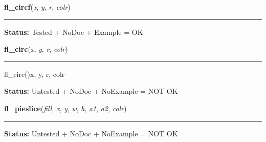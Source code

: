     \label{xformslib:library:fl_circf}

    \vspace{0.5ex}

\hspace{.8\funcindent}\begin{boxedminipage}{\funcwidth}

    \raggedright \textbf{fl\_circf}(\textit{x}, \textit{y}, \textit{r}, \textit{colr})

    \vspace{-1.5ex}

    \rule{\textwidth}{0.5\fboxrule}
\setlength{\parskip}{2ex}
\setlength{\parskip}{1ex}
\textbf{Status:} Tested + NoDoc + Example = OK



    \end{boxedminipage}

    \label{xformslib:library:fl_circ}

    \vspace{0.5ex}

\hspace{.8\funcindent}\begin{boxedminipage}{\funcwidth}

    \raggedright \textbf{fl\_circ}(\textit{x}, \textit{y}, \textit{r}, \textit{colr})

    \vspace{-1.5ex}

    \rule{\textwidth}{0.5\fboxrule}
\setlength{\parskip}{2ex}
    fl\_circ()x, y, r, colr

\setlength{\parskip}{1ex}
\textbf{Status:} Untested + NoDoc + NoExample = NOT OK



    \end{boxedminipage}

    \label{xformslib:library:fl_pieslice}

    \vspace{0.5ex}

\hspace{.8\funcindent}\begin{boxedminipage}{\funcwidth}

    \raggedright \textbf{fl\_pieslice}(\textit{fill}, \textit{x}, \textit{y}, \textit{w}, \textit{h}, \textit{a1}, \textit{a2}, \textit{colr})

    \vspace{-1.5ex}

    \rule{\textwidth}{0.5\fboxrule}
\setlength{\parskip}{2ex}
\setlength{\parskip}{1ex}
\textbf{Status:} Untested + NoDoc + NoExample = NOT OK



    \end{boxedminipage}

